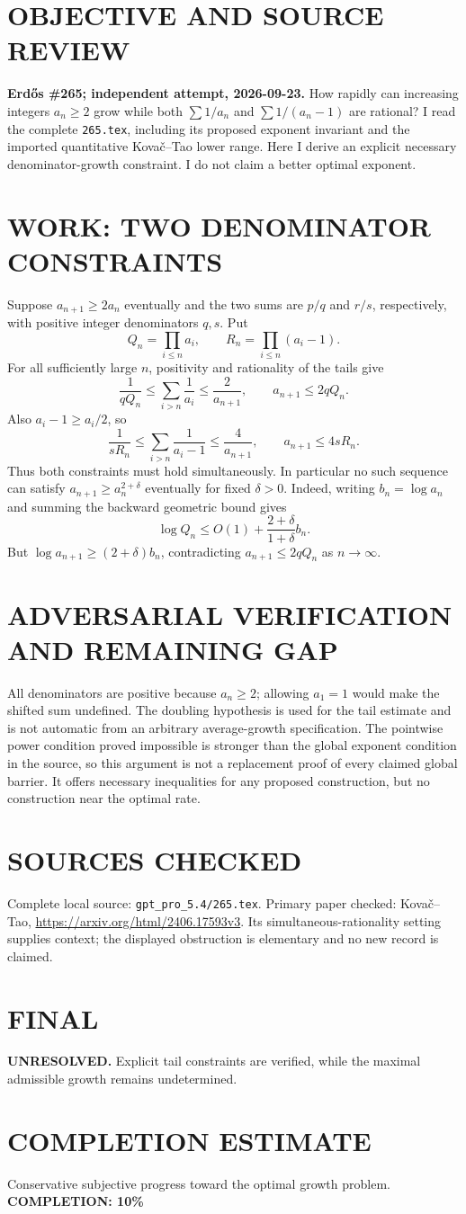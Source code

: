\section{OBJECTIVE AND SOURCE REVIEW}
\textbf{Erd\H{o}s \#265; independent attempt, 2026-09-23.}
How rapidly can increasing integers $a_n\ge2$ grow while both $\sum1/a_n$ and $\sum1/(a_n-1)$ are rational? I read the complete \texttt{265.tex}, including its proposed exponent invariant and the imported quantitative Kova\v c--Tao lower range. Here I derive an explicit necessary denominator-growth constraint. I do not claim a better optimal exponent.
\section{WORK: TWO DENOMINATOR CONSTRAINTS}
Suppose $a_{n+1}\ge2a_n$ eventually and the two sums are $p/q$ and $r/s$, respectively, with positive integer denominators $q,s$. Put
\[
Q_n=\prod_{i\le n}a_i,\qquad R_n=\prod_{i\le n}(a_i-1).
\]
For all sufficiently large $n$, positivity and rationality of the tails give
\[
\frac1{qQ_n}\le\sum_{i>n}\frac1{a_i}\le\frac2{a_{n+1}},
\qquad a_{n+1}\le2qQ_n.
\]
Also $a_i-1\ge a_i/2$, so
\[
\frac1{sR_n}\le\sum_{i>n}\frac1{a_i-1}\le\frac4{a_{n+1}},
\qquad a_{n+1}\le4sR_n.
\]
Thus both constraints must hold simultaneously. In particular no such sequence can satisfy $a_{n+1}\ge a_n^{2+\delta}$ eventually for fixed $\delta>0$. Indeed, writing $b_n=\log a_n$ and summing the backward geometric bound gives
\[
\log Q_n\le O(1)+\frac{2+\delta}{1+\delta}b_n.
\]
But $\log a_{n+1}\ge(2+\delta)b_n$, contradicting $a_{n+1}\le2qQ_n$ as $n\to\infty$.
\section{ADVERSARIAL VERIFICATION AND REMAINING GAP}
All denominators are positive because $a_n\ge2$; allowing $a_1=1$ would make the shifted sum undefined. The doubling hypothesis is used for the tail estimate and is not automatic from an arbitrary average-growth specification. The pointwise power condition proved impossible is stronger than the global exponent condition in the source, so this argument is not a replacement proof of every claimed global barrier. It offers necessary inequalities for any proposed construction, but no construction near the optimal rate.
\section{SOURCES CHECKED}
Complete local source: \texttt{gpt\_pro\_5.4/265.tex}. Primary paper checked: Kova\v c--Tao, \url{https://arxiv.org/html/2406.17593v3}. Its simultaneous-rationality setting supplies context; the displayed obstruction is elementary and no new record is claimed.
\section{FINAL}
\textbf{UNRESOLVED.} Explicit tail constraints are verified, while the maximal admissible growth remains undetermined.
\section{COMPLETION ESTIMATE}
Conservative subjective progress toward the optimal growth problem.
\textbf{COMPLETION: 10\%}
